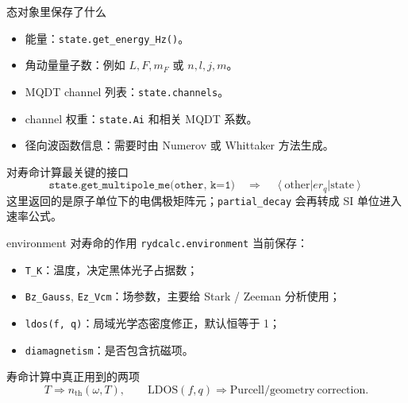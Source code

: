 \documentclass[aspectratio=169,11pt]{ctexbeamer}
\newcommand{\ket}[1]{\left|#1\right\rangle}
\newcommand{\bra}[1]{\left\langle#1\right|}
\begin{document}
\begin{frame}{态对象里保存了什么}
  \begin{itemize}
    \item 能量：\texttt{state.get\_energy\_Hz()}。
    \item 角动量量子数：例如 \(L,F,m_F\) 或 \(n,l,j,m\)。
    \item MQDT channel 列表：\texttt{state.channels}。
    \item channel 权重：\texttt{state.Ai} 和相关 MQDT 系数。
    \item 径向波函数信息：需要时由 Numerov 或 Whittaker 方法生成。
  \end{itemize}

  \begin{block}{对寿命计算最关键的接口}
    \[
      \texttt{state.get\_multipole\_me(other, k=1)}
      \quad\Rightarrow\quad
      \bra{\mathrm{other}} er_q \ket{\mathrm{state}}
    \]
    这里返回的是原子单位下的电偶极矩阵元；\texttt{partial\_decay} 会再转成 SI 单位进入速率公式。
  \end{block}
\end{frame}

\begin{frame}{environment 对寿命的作用}
  \texttt{rydcalc.environment} 当前保存：
  \begin{itemize}
    \item \texttt{T\_K}：温度，决定黑体光子占据数；
    \item \texttt{Bz\_Gauss}, \texttt{Ez\_Vcm}：场参数，主要给 Stark / Zeeman 分析使用；
    \item \texttt{ldos(f, q)}：局域光学态密度修正，默认恒等于 1；
    \item \texttt{diamagnetism}：是否包含抗磁项。
  \end{itemize}

  \begin{block}{寿命计算中真正用到的两项}
    \[
      T \Rightarrow n_{\mathrm{th}}(\omega,T),
      \qquad
      \mathrm{LDOS}(f,q) \Rightarrow \mathrm{Purcell/geometry\ correction}.
    \]
  \end{block}
\end{frame}
\end{document}
